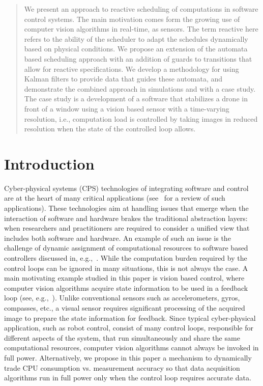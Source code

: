 \documentclass{sig-alternate-ipsn13}
\begin{document}
\maketitle
\begin{abstract}
We present an approach to reactive scheduling of computations in software control systems. The main motivation comes form the growing use of computer vision algorithms in real-time, as sensors. The term reactive here refers to the ability of the scheduler to adapt the schedules dynamically based on physical conditions. We propose an extension of the automata based scheduling approach with an addition of guards to transitions that allow for reactive specifications. We develop a methodology for using Kalman filters to provide data that guides these automata, and demonstrate the combined approach in simulations and with a case study. The case study is a development of a software that stabilizes a drone in front of a window using a vision based sensor with a time-varying resolution, i.e., computation load is controlled by taking images in reduced resolution when the state of the controlled loop allows.
\end{abstract}

\section{Introduction}
Cyber-physical systems (CPS) technologies of integrating software and control are at the heart of many critical applications (see~\cite{lee2008cyber} for a review of such applications). 
These technologies aim at handling issues that emerge when the interaction of software and hardware brakes the traditional abstraction layers: when researchers and practitioners are required to consider a unified view that includes both software and hardware. An example of such an issue is the challenge of dynamic assignment of computational resources to software based controllers discussed in, e.g.,~\cite{arzen2000introduction,tabuada2007event,weiss2007automata}. While the computation burden required by the control loops can be ignored in many situations, this is not always the case. A main motivating example studied in this paper is vision based control, where computer vision algorithms acquire state information to be used in a feedback loop (see, e.g.,~\cite{das2002vision,shakernia1999landing,Efraim2017}). Unlike conventional sensors such as accelerometers, gyros, compasses, etc., a visual sensor requires significant processing of the acquired image to prepare the state information for feedback. Since typical cyber-physical application, such as robot control, consist of many control loops, responsible for different aspects of the system, that run simultaneously and share the same computational resources, computer vision algorithms cannot always be invoked in full power. Alternatively, we propose in this paper a mechanism to dynamically trade CPU consumption vs. measurement accuracy so that data acquisition algorithms run in full power only when the control loop requires accurate data. 
\end{document}
